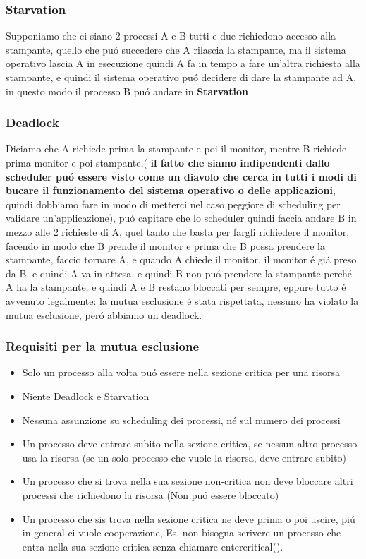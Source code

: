 \subsubsection*{Starvation}
Supponiamo che ci siano 2 processi A e B tutti e due richiedono accesso alla stampante, quello che puó
succedere che A rilascia la stampante, ma il sistema operativo lascia A in esecuzione quindi A fa in tempo a
fare un'altra richiesta alla stampante, e quindi il sistema operativo puó decidere di dare la stampante ad A,
in questo modo il processo B puó andare in \textbf{Starvation}
\subsubsection*{Deadlock}
Diciamo che A richiede prima la stampante e poi il monitor, mentre B richiede prima monitor e poi stampante,( \textbf{il fatto che siamo indipendenti dallo scheduler puó essere visto come un diavolo che cerca in tutti i modi di bucare il funzionamento del sistema operativo o delle applicazioni},
quindi dobbiamo fare in modo di metterci nel caso peggiore di scheduling per validare un'applicazione), puó capitare che lo scheduler quindi faccia andare B in mezzo alle 2 richieste di A, quel tanto che basta
per fargli richiedere il monitor, facendo in modo che B prende il monitor e prima che B possa prendere la stampante, faccio tornare A, e quando A
chiede il monitor, il monitor é giá preso da B, e quindi A va in attesa, e quindi B non puó prendere la stampante perché A ha la stampante, e quindi
A e B restano bloccati per sempre, eppure tutto é avvenuto legalmente: la mutua esclusione é stata rispettata, nessuno ha violato la mutua esclusione, peró abbiamo
un deadlock.
\subsubsection*{Requisiti per la mutua esclusione}
\begin{itemize}
    \item Solo un processo alla volta puó essere nella sezione critica per una risorsa
    \item Niente Deadlock e Starvation
    \item Nessuna assunzione su scheduling dei processi, né sul numero dei processi
    \item Un processo deve entrare subito nella sezione critica, se nessun altro processo usa la risorsa (se un solo processo che vuole la risorsa, deve entrare subito)
    \item Un processo che si trova nella sua sezione non-critica non deve bloccare altri processi che richiedono la risorsa (Non puó essere bloccato)
    \item Un processo che sis trova nella sezione critica ne deve prima o poi uscire, piú in general ci vuole cooperazione, Es. non bisogna scrivere un processo che entra nella sua sezione critica senza chiamare entercritical().
\end{itemize}
